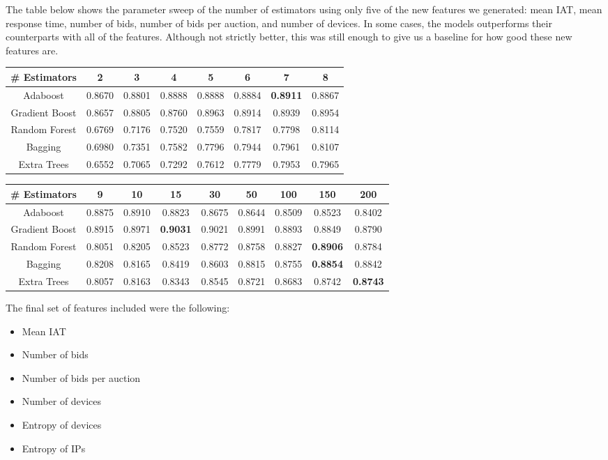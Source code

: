 \documentclass{article} %
\begin{document}
The table below shows the parameter sweep of the number of estimators using only five
of the new features we generated: mean IAT, mean response time, number of bids,
number of bids per auction, and number of devices. In some cases, the models
outperforms their counterparts with all of the features. Although not strictly
better, this was still enough to give us a baseline for how good these new features are.

\begin{adjustbox}{width=\textwidth,totalheight=\textheight,keepaspectratio}
\begin{tabular}{c | c c c c c c c}
\# Estimators & 2 & 3 & 4 & 5 & 6 & 7 & 8\\
\hline
Adaboost & 0.8670 & 0.8801 & 0.8888 & 0.8888 & 0.8884 & \textbf{0.8911} & 0.8867\\
Gradient Boost & 0.8657 & 0.8805 & 0.8760 & 0.8963 & 0.8914 & 0.8939 & 0.8954\\
Random Forest & 0.6769 & 0.7176 & 0.7520 & 0.7559 & 0.7817 & 0.7798 & 0.8114\\
Bagging & 0.6980 & 0.7351 & 0.7582 & 0.7796 & 0.7944 & 0.7961 & 0.8107\\
Extra Trees & 0.6552 & 0.7065 & 0.7292 & 0.7612 & 0.7779 & 0.7953 & 0.7965
\end{tabular}
\end{adjustbox}
\begin{adjustbox}{width=\textwidth,totalheight=\textheight,keepaspectratio}
\begin{tabular}{c | c c c c c c c c}
\# Estimators & 9 & 10 & 15 & 30 & 50 & 100 & 150 & 200\\
\hline
Adaboost & 0.8875 & 0.8910 & 0.8823 & 0.8675 & 0.8644 & 0.8509 & 0.8523 & 0.8402\\
Gradient Boost & 0.8915 & 0.8971 & \textbf{0.9031} & 0.9021 & 0.8991 & 0.8893 & 0.8849 & 0.8790\\
Random Forest & 0.8051 & 0.8205 & 0.8523 & 0.8772 & 0.8758 & 0.8827 & \textbf{0.8906} & 0.8784\\
Bagging & 0.8208 & 0.8165 & 0.8419 & 0.8603 & 0.8815 & 0.8755 & \textbf{0.8854} & 0.8842\\
Extra Trees & 0.8057 & 0.8163 & 0.8343 & 0.8545 & 0.8721 & 0.8683 & 0.8742 & \textbf{0.8743}
\end{tabular}
\end{adjustbox}


The final set of features included were the following:

\begin{itemize}
\item Mean IAT
\item Number of bids
\item Number of bids per auction
\item Number of devices
\item Entropy of devices
\item Entropy of IPs
\end{itemize}
\end{document}
